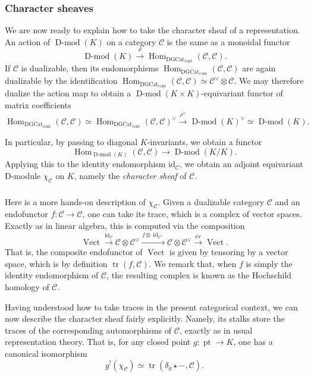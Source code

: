 \documentclass[10pt]{amsart}
\newcommand{\pt}{\on{pt}}
\newcommand{\udHom}{\on{Hom}_{\DGCat}}
\newcommand{\on}{\operatorname}
\newcommand{\Dmod}{\on{D-mod}}
\newcommand{\Vect}{\on{Vect}}
\theoremstyle{remark}
\newcommand{\Hom}{\operatorname{Hom}}
\newcommand{\id}{\text{id}}
\numberwithin{equation}{section}
\newcommand{\sC}{\mathscr{C}}
\newcommand{\msf}{\operatorname}
\newcommand{\DGCat}{\msf{DGCat}_{\on{cont}}}
\begin{document}
\subsubsection{Character sheaves} We are now ready to explain how to take the character sheaf of a representation. An action of $\Dmod(K)$ on a category $\sC$ 
is the same as a monoidal functor 
%
\[
\Dmod(K) \xrightarrow{\rho} \udHom(\sC, \sC).
\]
%
If $\sC$ is dualizable, then its endomorphisms $\udHom(\sC, \sC)$ are again dualizable by the identification $\udHom(\sC, \sC) \simeq 
\sC^\vee \otimes \sC$. We may therefore dualize the action 
map to obtain a $\Dmod(K \times K)$-equivariant functor of matrix coefficients 
%
\[
   \udHom(\sC, \sC) \simeq \udHom(\sC, \sC)^\vee \xrightarrow{\rho^\vee} 
   \Dmod(K)^\vee \simeq \Dmod(K).
\]
%

In particular, by passing to diagonal $K$-invariants, we obtain a functor 
%
\begin{equation} \label{e:mcequivfunc}
   \Hom_{\Dmod(K)}(\sC, \sC) \rightarrow \Dmod(K / K ).
\end{equation}
%
 Applying this to the identity endomorphism $\id_{\sC}$, we obtain an adjoint 
 equivariant D-module $\chi_\sC$ on $K$, 
 namely the {\em character sheaf} of $\sC$. 




\subsubsection{} Here is a more hands-on description of $\chi_\sC$. Given a 
dualizable category $\sC$ and an endofunctor $f: \sC \rightarrow \sC$, one can 
take its trace, which is a complex of vector spaces. Exactly as in linear 
algebra, this is computed via the composition 
%
\[
\Vect \xrightarrow{\id_{\sC}} \sC \otimes \sC^\vee \xrightarrow{f \otimes 
\on{id}_{\sC^\vee}} \sC \otimes \sC^\vee \xrightarrow{\on{ev}} \Vect.
\]
%
That is, the composite endofunctor of $\Vect$ is given by tensoring by a vector space, which is by 
definition $\on{tr}(f, \sC)$. We remark that, when $f$ is simply the identity 
endomorphism of $\sC$, the resulting complex is known as the Hochschild 
homology of $\sC$. 


Having understood how to take traces in the present categorical context, we can now describe the character sheaf fairly explicitly. Namely, its stalks store the traces of the 
corresponding automorphisms of $\sC$, exactly as in usual representation 
theory. That is, for any closed point $g: \pt \rightarrow K$, one has a 
canonical isomorphism 
%
\[
     g^!(\chi_\sC) \simeq \on{tr}( \delta_g \star -, \sC). 
\]
%
\end{document}
